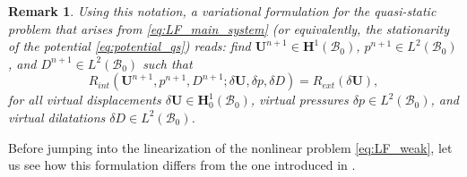 \documentclass{sfuthesis}
\numberwithin{equation}{section}
\numberwithin{figure}{chapter}
\numberwithin{table}{chapter}
\newtheorem{remark}[theorem]{Remark}
\theoremstyle{definition}
\def\*#1{{\mathbf{#1}}} %
\newcommand{\B}{\mathcal{B}}
\begin{document}
\begin{remark}
    Using this notation, a variational formulation for the quasi-static problem that arises from \eqref{eq:LF_main_system} (or equivalently, the stationarity of the potential \eqref{eq:potential_qs}) reads: find $\*U^{n+1} \in \*H^1(\B_0)$, $p^{n+1} \in L^2(\B_0)$, and $D^{n+1} \in L^2(\B_0)$ such that
    \begin{equation}
        R_{int}(\*U^{n+1}, p^{n+1}, D^{n+1} ; \delta\*U, \delta p, \delta D) = R_{ext}(\delta \*U),
    \end{equation} 
    for all virtual displacements $\delta\*U \in \*H_0^1(\B_0)$, virtual pressures $\delta p \in L^2(\B_0)$, and virtual dilatations $\delta D \in L^2(\B_0)$. %
\end{remark}

Before jumping into the linearization of the nonlinear problem \eqref{eq:LF_weak}, let us see how this formulation differs from the one introduced in \cite{Seba}.
\end{document}
